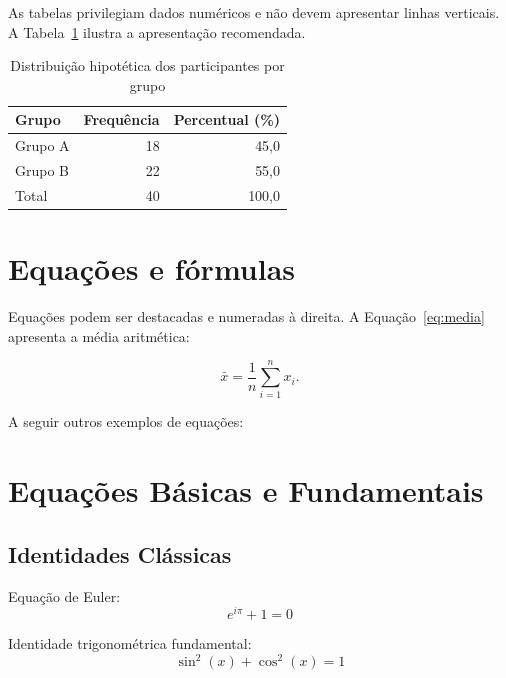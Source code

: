 As tabelas privilegiam dados numéricos e não devem apresentar linhas verticais. A Tabela~\ref{tab:exemplo} ilustra a apresentação recomendada.

\begin{table}[H]
  \caption{Distribuição hipotética dos participantes por grupo}
  \label{tab:exemplo}
  \centering
  \begin{tabular}{lrr}
    \toprule
    Grupo & Frequência & Percentual (\%) \\
    \midrule
    Grupo A & 18 & 45,0 \\
    Grupo B & 22 & 55,0 \\
    \midrule
    Total & 40 & 100,0 \\
    \bottomrule
  \end{tabular}
\end{table}

\section{Equações e fórmulas}

Equações podem ser destacadas e numeradas à direita. A Equação~\eqref{eq:media} apresenta a média aritmética:

\begin{equation}
  \bar{x}=\frac{1}{n}\sum_{i=1}^{n}x_i.
  \label{eq:media}
\end{equation}

A seguir outros exemplos de equações:



\section{Equações Básicas e Fundamentais}

\subsection{Identidades Clássicas}

Equação de Euler:
\begin{equation}
e^{i\pi} + 1 = 0
\end{equation}

Identidade trigonométrica fundamental:
\begin{equation}
\sin^2(x) + \cos^2(x) = 1
\end{equation}


